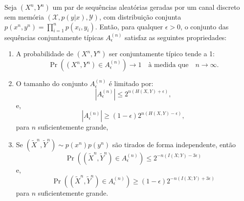 


\begin{theorem}
Seja $(X^n, Y^n)$ um par de sequências aleatórias geradas por um canal discreto sem memória 
$(\mathcal{X}, p(y|x), \mathcal{Y})$, com distribuição conjunta $p(x^n, y^n) = \prod_{i=1}^n p(x_i, y_i)$. 
Então, para qualquer $\epsilon > 0$, o conjunto das sequências conjuntamente típicas $A_{\epsilon}^{(n)}$ satisfaz as seguintes propriedades:
\begin{enumerate}
  \item A probabilidade de $(X^n, Y^n)$ ser conjuntamente típico tende a 1:
     \begin{equation}
     \Pr \left( (X^n, Y^n) \in A_{\epsilon}^{(n)} \right) \to 1 \quad \text{à medida que} \quad n \to \infty.
     \end{equation}
  \item O tamanho do conjunto $A_{\epsilon}^{(n)}$ é limitado por:
     \begin{equation}
     |A_{\epsilon}^{(n)}| \leq 2^{n(H(X,Y) + \epsilon)},
     \end{equation}
     e,
     \begin{equation}
     |A_{\epsilon}^{(n)}| \geq (1 - \epsilon) 2^{n(H(X,Y) - \epsilon)} ,
     \end{equation}
    para $n$ suficientemente grande,
    \item Se $(\tilde{X}^n, \tilde{Y}^n) \sim p(x^n)p(y^n)$ são tirados de forma independente, então
      \begin{equation}
        \Pr \left( (\tilde{X}^n, \tilde{Y}^n) \in A_{\epsilon}^{(n)} \right) \leq 2^{-n(I(X;Y)-3\epsilon)}
      \end{equation}
      e,
      \begin{equation}
        \Pr \left( (\tilde{X}^n, \tilde{Y}^n) \in A_{\epsilon}^{(n)} \right) \geq (1-\epsilon)2^{-n(I(X;Y)+3\epsilon)}
      \end{equation}
      para $n$ suficientemente grande.
\end{enumerate}
\end{theorem}





